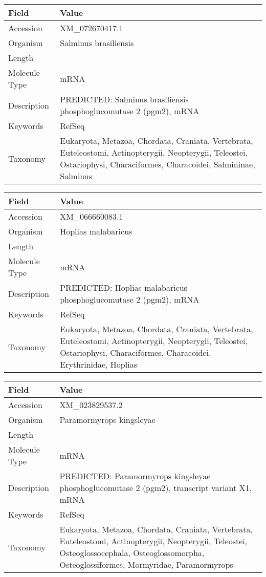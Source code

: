 \documentclass[10pt]{article}
\begin{document}
{\footnotesize
\begin{longtable}{>{\raggedright\arraybackslash}p{4.5cm} >{\raggedright\arraybackslash}p{11.5cm}}
\textbf{Field} & \textbf{Value} \\
\hline
Accession & XM\_072670417.1 \\
Organism & Salminus brasiliensis \\
Length & 3773 \\
Molecule Type & mRNA \\
Description & PREDICTED: Salminus brasiliensis phosphoglucomutase 2 (pgm2), mRNA \\
Keywords & RefSeq \\
Taxonomy & Eukaryota, Metazoa, Chordata, Craniata, Vertebrata, Euteleostomi, Actinopterygii, Neopterygii, Teleostei, Ostariophysi, Characiformes, Characoidei, Salmininae, Salminus \\
\end{longtable}
}

{\footnotesize
\begin{longtable}{>{\raggedright\arraybackslash}p{4.5cm} >{\raggedright\arraybackslash}p{11.5cm}}
\textbf{Field} & \textbf{Value} \\
\hline
Accession & XM\_066660083.1 \\
Organism & Hoplias malabaricus \\
Length & 3132 \\
Molecule Type & mRNA \\
Description & PREDICTED: Hoplias malabaricus phosphoglucomutase 2 (pgm2), mRNA \\
Keywords & RefSeq \\
Taxonomy & Eukaryota, Metazoa, Chordata, Craniata, Vertebrata, Euteleostomi, Actinopterygii, Neopterygii, Teleostei, Ostariophysi, Characiformes, Characoidei, Erythrinidae, Hoplias \\
\end{longtable}
}

{\footnotesize
\begin{longtable}{>{\raggedright\arraybackslash}p{4.5cm} >{\raggedright\arraybackslash}p{11.5cm}}
\textbf{Field} & \textbf{Value} \\
\hline
Accession & XM\_023829537.2 \\
Organism & Paramormyrops kingsleyae \\
Length & 3149 \\
Molecule Type & mRNA \\
Description & PREDICTED: Paramormyrops kingsleyae phosphoglucomutase 2 (pgm2), transcript variant X1, mRNA \\
Keywords & RefSeq \\
Taxonomy & Eukaryota, Metazoa, Chordata, Craniata, Vertebrata, Euteleostomi, Actinopterygii, Neopterygii, Teleostei, Osteoglossocephala, Osteoglossomorpha, Osteoglossiformes, Mormyridae, Paramormyrops \\
\end{longtable}
}
\end{document}
